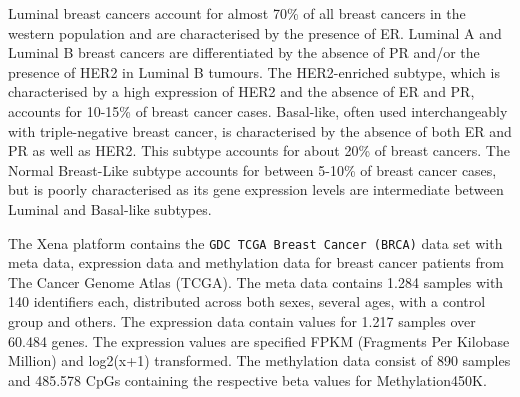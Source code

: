 \documentclass[pdftex,12pt,a4paper]{report}
\begin{document}
Luminal breast cancers account for almost 70\% of all breast cancers in the western population and are characterised by the presence of ER. Luminal A and Luminal B breast cancers are differentiated by the absence of PR and/or the presence of HER2 in Luminal B tumours. The HER2-enriched subtype, which is characterised by a high expression of HER2 and the absence of ER and PR, accounts for 10-15\% of breast cancer cases. Basal-like, often used interchangeably with triple-negative breast cancer, is characterised by the absence of both ER and PR as well as HER2\cite{brca_general}. This subtype accounts for about 20\% of breast cancers. The Normal Breast-Like subtype accounts for between 5-10\% of breast cancer cases, but is poorly characterised as its gene expression levels are intermediate between Luminal and Basal-like subtypes\cite{brca_normal_like}.

The Xena platform\cite{xena} contains the \texttt{GDC TCGA Breast Cancer (BRCA)} data set with meta data, expression data and methylation data for breast cancer patients from The Cancer Genome Atlas (TCGA)\cite{tcga}. The meta data contains 1.284 samples with 140 identifiers each, distributed across both sexes, several ages, with a control group and others. The expression data contain values for 1.217 samples over 60.484 genes. The expression values are specified FPKM (Fragments Per Kilobase Million) and log2(x+1) transformed. The methylation data consist of 890 samples and 485.578 CpGs containing the respective beta values for Methylation450K\cite{methylation450}. 
\end{document}
